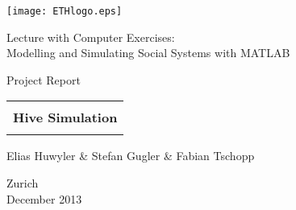 
\thispagestyle{empty}

\begin{center}
	\texttt{[image: ETHlogo.eps]}
	
	\bigskip
	
	
	\bigskip
	
	
	\bigskip
	
	
	\LARGE{ 	Lecture with Computer Exercises:\\ }
	\LARGE{ Modelling and Simulating Social Systems with MATLAB\\}
	
	\bigskip
	
	\bigskip
	
	\small{Project Report}\\
	
	\bigskip
	
	\bigskip
	
	\bigskip
	
	\bigskip
	
	
	\begin{tabular}{|c|}
		\hline
		\\
		\textbf{\LARGE{Hive Simulation}}\\
		\\
		\hline
	\end{tabular}
	\bigskip
	
	\bigskip
	
	\bigskip
	
	\LARGE{Elias Huwyler \& Stefan Gugler \& Fabian Tschopp}
	
	\bigskip
	
	\bigskip
	
	\bigskip
	
	\bigskip
	
	\bigskip
	
	\bigskip
	
	\bigskip
	
	\bigskip
	
	Zurich\\
	December 2013\\
\end{center}



